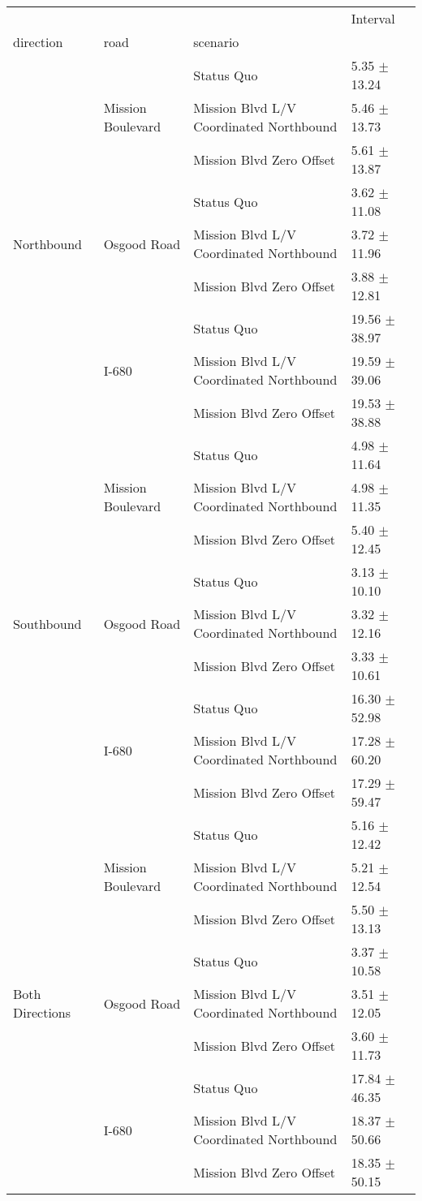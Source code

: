 \begin{tabular}{llll}
\toprule
 &  &  & Interval \\
direction & road & scenario &  \\
\midrule
\multirow[t]{9}{*}{Northbound} & \multirow[t]{3}{*}{Mission Boulevard} & Status Quo & 5.35 $\pm$ 13.24 \\
 &  & Mission Blvd L/V Coordinated Northbound & 5.46 $\pm$ 13.73 \\
 &  & Mission Blvd Zero Offset & 5.61 $\pm$ 13.87 \\
 & \multirow[t]{3}{*}{Osgood Road} & Status Quo & 3.62 $\pm$ 11.08 \\
 &  & Mission Blvd L/V Coordinated Northbound & 3.72 $\pm$ 11.96 \\
 &  & Mission Blvd Zero Offset & 3.88 $\pm$ 12.81 \\
 & \multirow[t]{3}{*}{I-680} & Status Quo & 19.56 $\pm$ 38.97 \\
 &  & Mission Blvd L/V Coordinated Northbound & 19.59 $\pm$ 39.06 \\
 &  & Mission Blvd Zero Offset & 19.53 $\pm$ 38.88 \\
\multirow[t]{9}{*}{Southbound} & \multirow[t]{3}{*}{Mission Boulevard} & Status Quo & 4.98 $\pm$ 11.64 \\
 &  & Mission Blvd L/V Coordinated Northbound & 4.98 $\pm$ 11.35 \\
 &  & Mission Blvd Zero Offset & 5.40 $\pm$ 12.45 \\
 & \multirow[t]{3}{*}{Osgood Road} & Status Quo & 3.13 $\pm$ 10.10 \\
 &  & Mission Blvd L/V Coordinated Northbound & 3.32 $\pm$ 12.16 \\
 &  & Mission Blvd Zero Offset & 3.33 $\pm$ 10.61 \\
 & \multirow[t]{3}{*}{I-680} & Status Quo & 16.30 $\pm$ 52.98 \\
 &  & Mission Blvd L/V Coordinated Northbound & 17.28 $\pm$ 60.20 \\
 &  & Mission Blvd Zero Offset & 17.29 $\pm$ 59.47 \\
\multirow[t]{9}{*}{Both Directions} & \multirow[t]{3}{*}{Mission Boulevard} & Status Quo & 5.16 $\pm$ 12.42 \\
 &  & Mission Blvd L/V Coordinated Northbound & 5.21 $\pm$ 12.54 \\
 &  & Mission Blvd Zero Offset & 5.50 $\pm$ 13.13 \\
 & \multirow[t]{3}{*}{Osgood Road} & Status Quo & 3.37 $\pm$ 10.58 \\
 &  & Mission Blvd L/V Coordinated Northbound & 3.51 $\pm$ 12.05 \\
 &  & Mission Blvd Zero Offset & 3.60 $\pm$ 11.73 \\
 & \multirow[t]{3}{*}{I-680} & Status Quo & 17.84 $\pm$ 46.35 \\
 &  & Mission Blvd L/V Coordinated Northbound & 18.37 $\pm$ 50.66 \\
 &  & Mission Blvd Zero Offset & 18.35 $\pm$ 50.15 \\
\bottomrule
\end{tabular}
